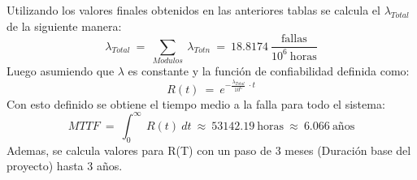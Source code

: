 Utilizando los valores finales obtenidos en las anteriores tablas se calcula el $\lambda_{Total}$ de la siguiente manera:
\begin{equation}
\lambda_{Total} \ = \  \sum_{Modulos} \  \lambda_{Totn}  \  =  \ 18.8174 \  \frac{\text{fallas}}{10^6 \ \text{horas}}
\end{equation}
Luego asumiendo que $\lambda$ es constante y la función de confiabilidad definida como:
\begin{equation}
R(t) \ = \ e^{-\frac{\lambda_{Total}}{10^6}\ \cdot t}
\end{equation}
Con esto definido se obtiene el tiempo medio a la falla para todo el sistema:
\begin{equation}
MTTF \ = \ \int_0^\infty \ R(t)\ dt \ \approx \ 53142.19 \ \text{horas} \ \approx \ 6.066 \ \text{años}
\end{equation}
Ademas, se calcula valores para R(T) con un paso de 3 meses (Duración base del proyecto) hasta 3 años.
